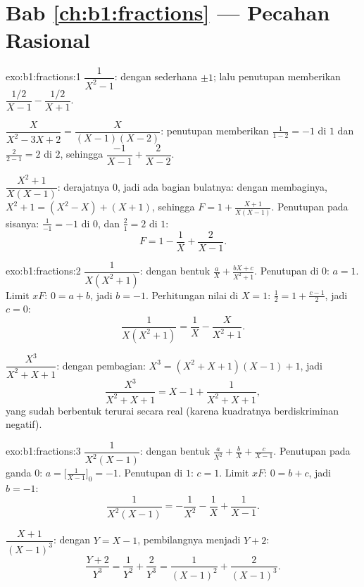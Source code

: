 \section*{Bab \ref{ch:b1:fractions} --- Pecahan Rasional}

\begin{solution}{exo:b1:fractions:1}
$\dfrac{1}{X^2 - 1}$: dengan  sederhana $\pm 1$; lalu penutupan memberikan
$\dfrac{1/2}{X-1} - \dfrac{1/2}{X+1}$.

$\dfrac{X}{X^2 - 3X + 2} = \dfrac{X}{(X-1)(X-2)}$: penutupan memberikan
$\frac{1}{1-2} = -1$ di $1$ dan $\frac{2}{2-1} = 2$ di $2$, sehingga
$\dfrac{-1}{X-1} + \dfrac{2}{X-2}$.

$\dfrac{X^2+1}{X(X-1)}$: derajatnya $0$, jadi ada bagian
bulatnya: dengan membaginya, $X^2 + 1 = (X^2 - X) + (X + 1)$, sehingga $F = 1 +
\frac{X+1}{X(X-1)}$. Penutupan pada sisanya: $\frac{1}{-1} = -1$
di $0$, dan $\frac{2}{1} = 2$ di $1$:
\[
F = 1 - \frac{1}{X} + \frac{2}{X-1} .
\]
\end{solution}

\begin{solution}{exo:b1:fractions:2}
$\dfrac{1}{X(X^2+1)}$: dengan bentuk $\frac aX + \frac{bX + c}{X^2 + 1}$.
Penutupan di $0$: $a = 1$. Limit $xF$: $0 = a + b$, jadi $b = -1$.
Perhitungan nilai di $X = 1$: $\frac12 = 1 + \frac{c - 1}{2}$, jadi $c = 0$:
\[
\frac{1}{X(X^2+1)} = \frac 1X - \frac{X}{X^2+1} .
\]

$\dfrac{X^3}{X^2+X+1}$: dengan pembagian: $X^3 = (X^2+X+1)(X - 1) + 1$, jadi
\[
\frac{X^3}{X^2+X+1} = X - 1 + \frac{1}{X^2 + X + 1} ,
\]
yang sudah berbentuk terurai secara real (karena kuadratnya berdiskriminan
negatif).
\end{solution}

\begin{solution}{exo:b1:fractions:3}
$\dfrac{1}{X^2(X-1)}$: dengan bentuk $\frac{a}{X^2} + \frac bX +
\frac{c}{X-1}$. Penutupan pada  ganda $0$:
$a = \bigl[\frac{1}{X-1}\bigr]_{0} = -1$. Penutupan di $1$: $c = 1$.
Limit $xF$: $0 = b + c$, jadi $b = -1$:
\[
\frac{1}{X^2(X-1)} = -\frac{1}{X^2} - \frac1X + \frac{1}{X-1} .
\]

$\dfrac{X+1}{(X-1)^3}$: dengan $Y = X - 1$, pembilangnya menjadi $Y + 2$:
\[
\frac{Y + 2}{Y^3} = \frac{1}{Y^2} + \frac{2}{Y^3}
= \frac{1}{(X-1)^2} + \frac{2}{(X-1)^3} .
\]
\end{solution}

